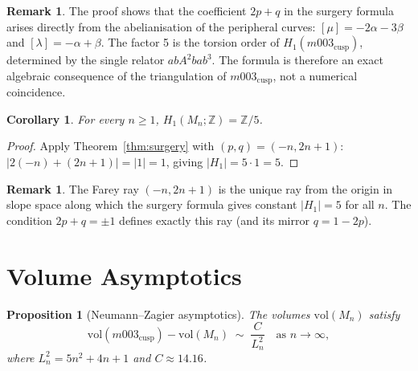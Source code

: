 \documentclass[11pt,a4paper]{article}
\newtheorem{proposition}[theorem]{Proposition}
\newtheorem{corollary}[theorem]{Corollary}
\theoremstyle{definition}
\newtheorem{remark}[theorem]{Remark}
\newcommand{\ZZ}{\mathbb{Z}}
\newcommand{\Zfive}{\ZZ/5}
\newcommand{\vol}{\mathrm{vol}}
\newcommand{\Mn}{M_n}
\newcommand{\Mcusp}{m003_{\mathrm{cusp}}}
\begin{document}
\begin{remark}
The proof shows that the coefficient $2p+q$ in the surgery formula
arises directly from the abelianisation of the peripheral curves:
$[\mu] = -2\alpha-3\beta$ and $[\lambda]=-\alpha+\beta$.
The factor 5 is the torsion order of $H_1(\Mcusp)$,
determined by the single relator $ab A^2 b a b^3$.
The formula is therefore an exact algebraic consequence of the
triangulation of $\Mcusp$, not a numerical coincidence.
\end{remark}

\begin{corollary}
\label{cor:tower_h1}
For every $n \geq 1$, $H_1(\Mn;\ZZ) = \Zfive$.
\end{corollary}

\begin{proof}
Apply Theorem~\ref{thm:surgery} with $(p,q)=(-n,2n+1)$:
$|2(-n)+(2n+1)| = |1| = 1$, giving $|H_1| = 5\cdot 1 = 5$.
\end{proof}

\begin{remark}
The Farey ray $(-n,2n+1)$ is the unique ray from the origin in
slope space along which the surgery formula gives constant
$|H_1|=5$ for all $n$. The condition $2p+q = \pm 1$ defines
exactly this ray (and its mirror $q = 1-2p$).
\end{remark}

\section{Volume Asymptotics}
\label{sec:volume}

\begin{proposition}[Neumann--Zagier asymptotics]
\label{prop:NZ}
The volumes $\vol(\Mn)$ satisfy
\[
  \vol(\Mcusp) - \vol(\Mn) \;\sim\; \frac{C}{L_n^2}
  \quad\text{as } n\to\infty,
\]
where $L_n^2 = 5n^2+4n+1$ and $C \approx 14.16$.
\end{proposition}
\end{document}
